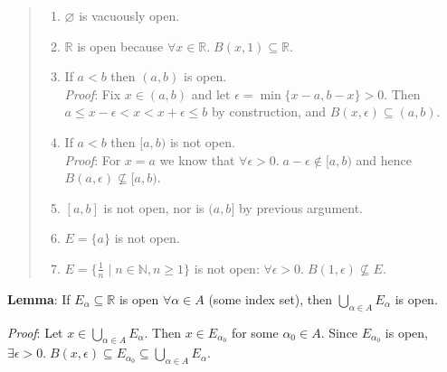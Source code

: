 \documentclass[11pt]{article}
\begin{document}
\begin{quote}\vspace{-0.3cm}
	\begin{enumerate}
	\item $\varnothing$ is vacuously open.

	\item $\mathbb{R}$ is open because $\forall x \in \mathbb{R}.\; B(x, 1) \subseteq \mathbb{R}$.

	\item If $a < b$ then $(a,b)$ is open.\\
	\emph{Proof}: Fix $x \in (a,b)$ and let $\epsilon = \min\{x-a, b-x\} > 0$. Then $a \leq x - \epsilon < x < x + \epsilon \leq b$ by construction, and $B(x, \epsilon) \subseteq (a,b)$.

	\item If $a < b$ then $[a,b)$ is not open.\\
	\emph{Proof}: For $x = a$ we know that $\forall \epsilon > 0.\; a - \epsilon \notin [a, b)$ and hence $B(a, \epsilon) \not \subseteq [a,b)$.

	\item $[a,b]$ is not open, nor is $(a,b]$ by previous argument.
	\item $E = \{a\}$ is not open.
	\item $E = \{\frac{1}{n} \;|\; n \in \mathbb{N}, n \geq 1\}$ is not open: $\forall \epsilon > 0.\; B(1, \epsilon) \not \subseteq E$.
	\end{enumerate}
\end{quote}

\textbf{Lemma}: If $E_\alpha \subseteq \mathbb{R}$ is open $\forall \alpha \in A$ (some index set), then $\bigcup_{\alpha \in A} E_\alpha$ is open.

\emph{Proof}: Let $x \in \bigcup_{\alpha \in A} E_\alpha$. Then $x \in E_{\alpha_0}$ for some $\alpha_0 \in A$. Since $E_{\alpha_0}$ is open, $\exists \epsilon > 0.\; B(x, \epsilon) \subseteq E_{\alpha_0} \subseteq \bigcup_{\alpha \in A} E_\alpha$.
\end{document}

